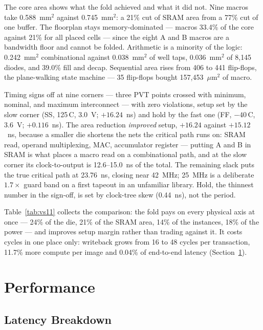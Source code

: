 \documentclass[conference,a4paper]{APSIPA2026}
\begin{document}
The core area shows what the fold achieved and what it did not. Nine macros take 0.588~mm$^2$ against 0.745~mm$^2$: a 21\% cut of SRAM area from a 77\% cut of one buffer. The floorplan stays memory-dominated --- macros 33.4\% of the core against 21\% for all placed cells --- since the eight A and B macros are a bandwidth floor and cannot be folded. Arithmetic is a minority of the logic: 0.242~mm$^2$ combinational against 0.038~mm$^2$ of well taps, 0.036~mm$^2$ of 8{,}145 diodes, and 39.0\% fill and decap. Sequential area rises from 406 to 441 flip-flops, the plane-walking state machine --- 35 flip-flops bought 157{,}453~$\mu$m$^2$ of macro.

Timing signs off at nine corners --- three PVT points crossed with minimum, nominal, and maximum interconnect --- with zero violations, setup set by the slow corner (SS, 125\,\textdegree C, 3.0~V; $+16.24$~ns) and hold by the fast one (FF, $-40$\,\textdegree C, 3.6~V; $+0.116$~ns). The area reduction \emph{improved} setup, $+16.24$ against $+15.12$~ns, because a smaller die shortens the nets the critical path runs on: SRAM read, operand multiplexing, MAC, accumulator register --- putting A and B in SRAM is what places a macro read on a combinational path, and at the slow corner its clock-to-output is 12.6--15.0~ns of the total. The remaining slack puts the true critical path at 23.76~ns, closing near 42~MHz; 25~MHz is a deliberate $1.7\times$ guard band on a first tapeout in an unfamiliar library. Hold, the thinnest number in the sign-off, is set by clock-tree skew (0.44~ns), not the period.

Table~\ref{tab:vs11} collects the comparison: the fold pays on every physical axis at once --- 24\% of the die, 21\% of the SRAM area, 14\% of the instances, 18\% of the power --- and improves setup margin rather than trading against it. It costs cycles in one place only: writeback grows from 16 to 48 cycles per transaction, 11.7\% more compute per image and 0.04\% of end-to-end latency (Section~\ref{sec:perf}).

\section{Performance}\label{sec:perf}

\subsection{Latency Breakdown}
\end{document}
